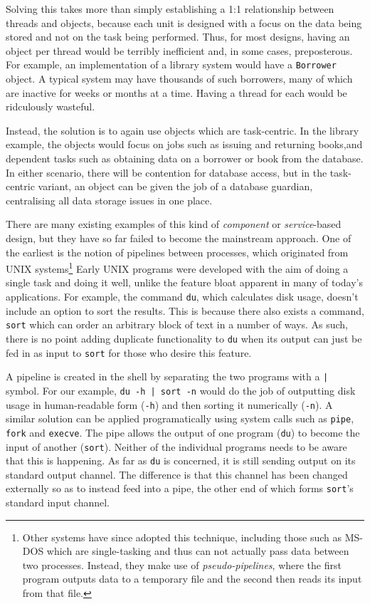 Solving this takes more than simply establishing a 1:1 relationship
between threads and objects, because each unit is designed with a
focus on the data being stored and not on the task being performed.
Thus, for most designs, having an object per thread would be terribly
inefficient and, in some cases, preposterous.  For example, an
implementation of a library system would have a \texttt{Borrower}
object.  A typical system may have thousands of such borrowers, many
of which are inactive for weeks or months at a time.  Having a thread
for each would be ridculously wasteful.  

Instead, the solution is to again use objects which are task-centric.
In the library example, the objects would focus on jobs such as
issuing and returning books,and dependent tasks such as obtaining data
on a borrower or book from the database.  In either scenario, there
will be contention for database access, but in the task-centric
variant, an object can be given the job of a database guardian,
centralising all data storage issues in one place.

There are many existing examples of this kind of \emph{component} or
\emph{service}-based design, but they have so far failed to become the
mainstream approach.  One of the earliest is the notion of pipelines
between processes, which originated from UNIX systems\footnote{Other
  systems have since adopted this technique, including those such as
  MS-DOS which are single-tasking and thus can not actually pass data
  between two processes.  Instead, they make use of
  \emph{pseudo-pipelines}, where the first program outputs data to a
  temporary file and the second then reads its input from that file.}
Early UNIX programs were developed with the aim of doing a single task
and doing it well, unlike the feature bloat apparent in many of
today's applications.  For example, the command \texttt{du}, which
calculates disk usage, doesn't include an option to sort the results.
This is because there also exists a command, \texttt{sort} which can
order an arbitrary block of text in a number of ways.  As such, there
is no point adding duplicate functionality to \texttt{du} when its
output can just be fed in as input to \texttt{sort} for those who
desire this feature.

A pipeline is created in the shell by separating the two programs with
a \texttt{|} symbol.  For our example, \texttt{du -h | sort -n} would
do the job of outputting disk usage in human-readable form
(\texttt{-h}) and then sorting it numerically (\texttt{-n}).  A
similar solution can be applied programatically using system calls
such as \texttt{pipe}, \texttt{fork} and \texttt{execve}.  The pipe
allows the output of one program (\texttt{du}) to become the input of
another (\texttt{sort}).  Neither of the individual programs needs to
be aware that this is happening.  As far as \texttt{du} is concerned,
it is still sending output on its standard output channel.  The
difference is that this channel has been changed externally so as to
instead feed into a pipe, the other end of which forms \texttt{sort}'s
standard input channel.

